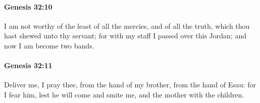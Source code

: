 		\paragraph{Genesis 32:10} %
			\label{GENESIS-32-10}

			I am not worthy of the least of all the mercies, and of all the truth, which thou hast shewed unto thy servant; for with my staff I passed over this Jordan; and now I am become two bands.


		\paragraph{Genesis 32:11} %
			\label{GENESIS-32-11}

			Deliver me, I pray thee, from the hand of my brother, from the hand of Esau: for I fear him, lest he will come and smite me, and the mother with the children.


